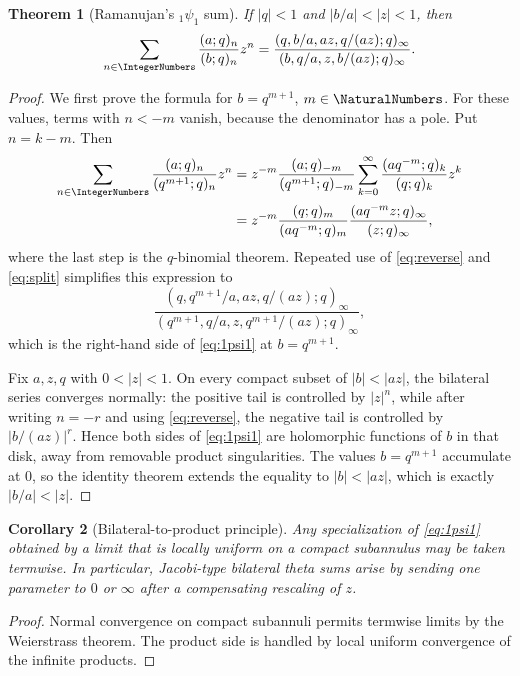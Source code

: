 \documentclass[11pt]{article}
\numberwithin{equation}{section}
\newtheorem{theorem}{Theorem}[section]
\newtheorem{corollary}[theorem]{Corollary}
\theoremstyle{definition}
\theoremstyle{remark}
\begin{document}
\begin{theorem}[Ramanujan's ${}_1\psi_1$ sum]\label{thm:1psi1}
If $|q|<1$ and $|b/a|<|z|<1$, then
\begin{equation}\label{eq:1psi1}
\sum_{n\in\IntegerNumbers}\frac{(a;q)_n}{(b;q)_n}z^n
=\frac{(q,b/a,az,q/(az);q)_\infty}
{(b,q/a,z,b/(az);q)_\infty}.
\end{equation}
\end{theorem}
\begin{proof}
We first prove the formula for $b=q^{m+1}$, $m\in\NaturalNumbers$.  For these values,
terms with $n<-m$ vanish, because the denominator has a pole.  Put $n=k-m$.
Then
\begin{align*}
\sum_{n\in\IntegerNumbers}\frac{(a;q)_n}{(q^{m+1};q)_n}z^n
&=z^{-m}\frac{(a;q)_{-m}}{(q^{m+1};q)_{-m}}
\sum_{k=0}^{\infty}
\frac{(aq^{-m};q)_k}{(q;q)_k}z^k\\
&=z^{-m}\frac{(q;q)_m}{(aq^{-m};q)_m}
\frac{(aq^{-m}z;q)_\infty}{(z;q)_\infty},
\end{align*}
where the last step is the $q$-binomial theorem.  Repeated use of
\eqref{eq:reverse} and \eqref{eq:split} simplifies this expression to
\[
\frac{(q,q^{m+1}/a,az,q/(az);q)_\infty}
{(q^{m+1},q/a,z,q^{m+1}/(az);q)_\infty},
\]
which is the right-hand side of \eqref{eq:1psi1} at $b=q^{m+1}$.

Fix $a,z,q$ with $0<|z|<1$.  On every compact subset of
$|b|<|az|$, the bilateral series converges normally: the positive tail is
controlled by $|z|^n$, while after writing $n=-r$ and using
\eqref{eq:reverse}, the negative tail is controlled by
$|b/(az)|^r$.  Hence both sides of \eqref{eq:1psi1} are holomorphic functions
of $b$ in that disk, away from removable product singularities.  The values
$b=q^{m+1}$ accumulate at $0$, so the identity theorem extends the equality
to $|b|<|az|$, which is exactly $|b/a|<|z|$.
\end{proof}

\begin{corollary}[Bilateral-to-product principle]\label{cor:bilateralprinciple}
Any specialization of \eqref{eq:1psi1} obtained by a limit that is locally
uniform on a compact subannulus may be taken termwise.  In particular,
Jacobi-type bilateral theta sums arise by sending one parameter to $0$ or
$\infty$ after a compensating rescaling of $z$.
\end{corollary}
\begin{proof}
Normal convergence on compact subannuli permits termwise limits by the
Weierstrass theorem.  The product side is handled by local uniform convergence
of the infinite products.
\end{proof}
\end{document}
